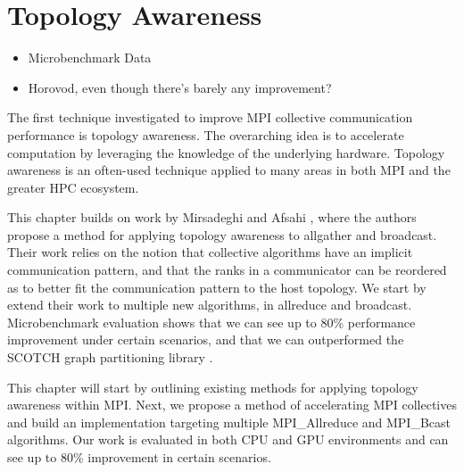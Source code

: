 
\glsresetall %
\chapter[Topology]{Topology Awareness}\label{ch:TopologyAwareness}


\begin{itemize}
    \item Microbenchmark Data
    \item Horovod, even though there's barely any improvement?
\end{itemize}

The first technique investigated to improve MPI collective communication performance is topology awareness.
The overarching idea is to accelerate computation by leveraging the knowledge of the underlying hardware.
Topology awareness is an often-used technique applied to many areas in both MPI and the greater HPC ecosystem.

This chapter builds on work by Mirsadeghi and Afsahi \cite{Mirsadeghi2016TopoAwareCollRR}, where the authors propose a method for applying topology awareness to allgather and broadcast.
Their work relies on the notion that collective algorithms have an implicit communication pattern, and that the ranks in a communicator can be reordered as to better fit the communication pattern to the host topology.
We start by extend their work to multiple new algorithms, in allreduce and broadcast.
Microbenchmark evaluation shows that we can see up to 80\% performance improvement under certain scenarios, and that we can outperformed the SCOTCH graph partitioning library \cite{Pellegrini2012SCOTCH}.

This chapter will start by outlining existing methods for applying topology awareness within MPI.
Next, we propose a method of accelerating MPI collectives and build an implementation targeting multiple MPI\_Allreduce and MPI\_Bcast algorithms.
Our work is evaluated in both CPU and GPU environments and can see up to 80\% improvement in certain scenarios.

